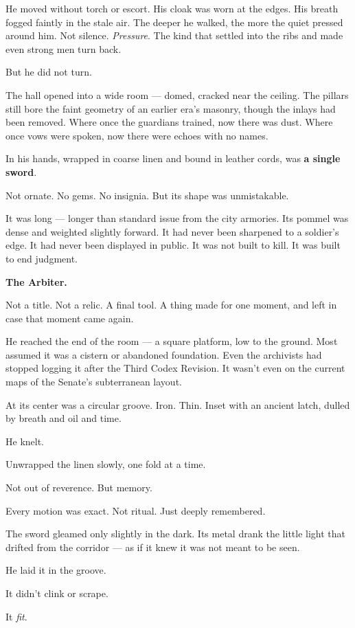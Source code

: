 \documentclass[12pt]{article}
\begin{document}
He moved without torch or escort. His cloak was worn at the edges. His breath fogged faintly in the stale air. The deeper he walked, the more the quiet pressed around him. Not silence. \textit{Pressure}. The kind that settled into the ribs and made even strong men turn back.

But he did not turn.

The hall opened into a wide room --- domed, cracked near the ceiling. The pillars still bore the faint geometry of an earlier era's masonry, though the inlays had been removed. Where once the guardians trained, now there was dust. Where once vows were spoken, now there were echoes with no names.

In his hands, wrapped in coarse linen and bound in leather cords, was \textbf{a single sword}.

Not ornate. No gems. No insignia. But its shape was unmistakable.

It was long --- longer than standard issue from the city armories. Its pommel was dense and weighted slightly forward. It had never been sharpened to a soldier’s edge. It had never been displayed in public. It was not built to kill. It was built to end judgment.

\textbf{The Arbiter.}

Not a title. Not a relic. A final tool. A thing made for one moment, and left in case that moment came again.

He reached the end of the room --- a square platform, low to the ground. Most assumed it was a cistern or abandoned foundation. Even the archivists had stopped logging it after the Third Codex Revision. It wasn’t even on the current maps of the Senate’s subterranean layout.

At its center was a circular groove. Iron. Thin. Inset with an ancient latch, dulled by breath and oil and time.

He knelt.

Unwrapped the linen slowly, one fold at a time.

Not out of reverence. But memory.

Every motion was exact. Not ritual. Just deeply remembered.

The sword gleamed only slightly in the dark. Its metal drank the little light that drifted from the corridor --- as if it knew it was not meant to be seen.

He laid it in the groove.

It didn’t clink or scrape.

It \textit{fit}.
\end{document}
